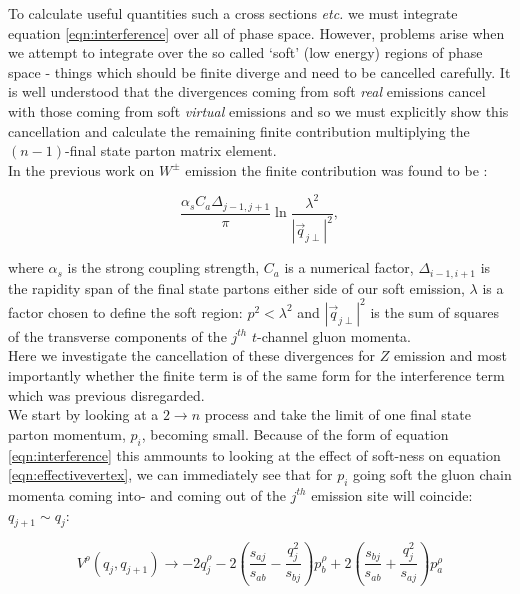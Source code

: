 		To calculate useful quantities such a cross sections \emph{etc.} we must integrate equation
		\ref{eqn:interference} over all of phase space.  However, problems arise when we attempt to
		integrate over the so called `soft' (low energy) regions of phase space - things which should
		be finite diverge and need to be cancelled carefully.  It is well understood that the divergences
		coming from soft \emph{real} emissions cancel with those coming from soft \emph{virtual} emissions
		and so we must explicitly show this cancellation and calculate the remaining finite contribution
		multiplying the $(n-1)$-final state parton matrix element.\\In the previous work on $W^\pm$
		emission the finite contribution was found to be \cite{JeppeHiggs}\cite{Constructing}:

		\begin{equation}
			\frac{\alpha_s C_a \Delta_{j-1, j+1}}{\pi}\ln{\frac{\lambda^2}{|\vec{q}_{j\perp}|^2}},
		\end{equation}

		where $\alpha_s$ is the strong coupling strength, $C_a$ is a numerical factor, $\Delta_{i-1, i+1}$
		is the rapidity span of the final state partons either side of our soft emission, $\lambda$ is a
		factor chosen to define the soft region: $p^2 < \lambda^2$ and $|\vec{q}_{j\perp}|^2$ is the sum of
		squares of the transverse components of the $j^{th}$ $t$-channel gluon momenta.\\Here we investigate
		the cancellation of these divergences for $Z$ emission and most importantly whether the finite term
		is of the same form for the interference term which was previous disregarded.\\We start by looking
		at a $2\rightarrow n$ process and take the limit of one final state parton momentum, $p_i$, becoming
		small.  Because of the form of equation \ref{eqn:interference} this ammounts to looking at the
		effect of soft-ness on equation \ref{eqn:effectivevertex}, we can immediately see that for $p_i$
		going soft the gluon chain momenta coming into- and coming out of the $j^{th}$ emission site will
		coincide: $q_{j+1}\sim q_j$:

		\begin{equation}
			V^\rho(q_j, q_{j+1}) \rightarrow -2q_j^\rho - 2\left(\frac{s_{aj}}{s_{ab}} -
				\frac{q^2_{j}}{s_{bj}}\right)p_b^\rho + 2\left(\frac{s_{bj}}{s_{ab}} +
				\frac{q_j^2}{s_{aj}}\right)p_a^\rho
				\label{eqn:vertexlimit}
		\end{equation}


